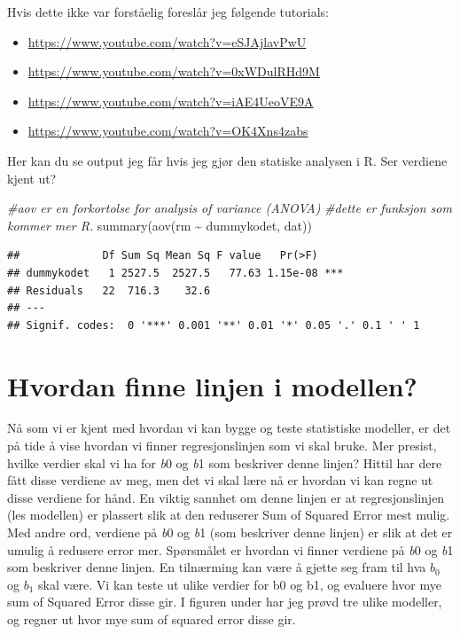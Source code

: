 \documentclass[
]{book}
\newenvironment{Shaded}{\begin{snugshade}}{\end{snugshade}}
\newcommand{\CommentTok}[1]{\textcolor[rgb]{0.56,0.35,0.01}{\textit{#1}}}
\newcommand{\FunctionTok}[1]{\textcolor[rgb]{0.00,0.00,0.00}{#1}}
\newcommand{\NormalTok}[1]{#1}
\newcommand{\SpecialCharTok}[1]{\textcolor[rgb]{0.00,0.00,0.00}{#1}}
\begin{document}
Hvis dette ikke var forståelig foreslår jeg følgende tutorials:

\begin{itemize}
\item
  \url{https://www.youtube.com/watch?v=eSJAjlavPwU}
\item
  \url{https://www.youtube.com/watch?v=0xWDulRHd9M}
\item
  \url{https://www.youtube.com/watch?v=iAE4UeoVE9A}
\item
  \url{https://www.youtube.com/watch?v=OK4Xns4zabs}
\end{itemize}

Her kan du se output jeg får hvis jeg gjør den statiske analysen i R. Ser verdiene kjent ut?

\begin{Shaded}
\begin{Highlighting}[]
\CommentTok{\#aov er en forkortolse for analysis of variance (ANOVA)}
\CommentTok{\#dette er funksjon som kommer mer R.}
\FunctionTok{summary}\NormalTok{(}\FunctionTok{aov}\NormalTok{(rm }\SpecialCharTok{\textasciitilde{}}\NormalTok{ dummykodet, dat))}
\end{Highlighting}
\end{Shaded}

\begin{verbatim}
##             Df Sum Sq Mean Sq F value   Pr(>F)    
## dummykodet   1 2527.5  2527.5   77.63 1.15e-08 ***
## Residuals   22  716.3    32.6                     
## ---
## Signif. codes:  0 '***' 0.001 '**' 0.01 '*' 0.05 '.' 0.1 ' ' 1
\end{verbatim}

\hypertarget{hvordan-finne-linjen-i-modellen}{%
\chapter{Hvordan finne linjen i modellen?}\label{hvordan-finne-linjen-i-modellen}}

Nå som vi er kjent med hvordan vi kan bygge og teste statistiske modeller, er det på tide å vise hvordan vi finner regresjonslinjen som vi skal bruke. Mer presist, hvilke verdier skal vi ha for \emph{b}0 og \emph{b}1 som beskriver denne linjen? Hittil har dere fått disse verdiene av meg, men det vi skal lære nå er hvordan vi kan regne ut disse verdiene for hånd. En viktig sannhet om denne linjen er at regresjonslinjen (les modellen) er plassert slik at den reduserer Sum of Squared Error mest mulig. Med andre ord, verdiene på \emph{b}0 og \emph{b}1 (som beskriver denne linjen) er slik at det er umulig å redusere error mer. Spørsmålet er hvordan vi finner verdiene på \emph{b}0 og \emph{b}1 som beskriver denne linjen. En tilnærming kan være å gjette seg fram til hva \(b_0\) og \(b_1\) skal være. Vi kan teste ut ulike verdier for b0 og b1, og evaluere hvor mye sum of Squared Error disse gir. I figuren under har jeg prøvd tre ulike modeller, og regner ut hvor mye sum of squared error disse gir.
\end{document}
